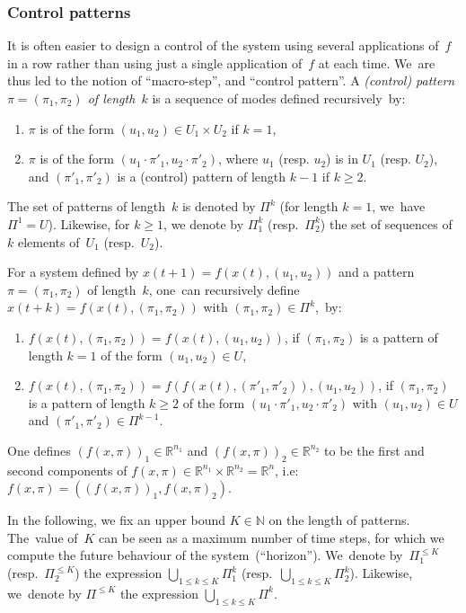 \subsubsection{Control patterns}
It is often easier to design a control of the system using several
applications of~$f$ in a row rather than using just a single
application of~$f$ at each time.  We~are thus led to the notion of
``macro-step'', and ``control pattern''.
%
A \emph{(control) pattern $\pi=(\pi_1,\pi_2)$ of length~$k$} 
is a sequence of modes defined recursively~by:
\begin{enumerate}
\item $\pi$ is of the form $(u_1,u_2)\in U_1\times U_2$ if $k=1$,
\item $\pi$ is of the form $(u_1\cdot \pi'_1,u_2\cdot \pi'_2)$,
where $u_1$ (resp. $u_2$) is in $U_1$ (resp. $U_2$),
and $(\pi'_1,\pi'_2)$ is a (control) pattern of length $k-1$ if $k\geq 2$.
\end{enumerate}

The set of patterns of length~$k$ is denoted by $\Pi^k$ (for length
$k=1$, we~have $\Pi^1=U$). Likewise, for $k\geq 1$, we denote by $\Pi_1^k$
(resp.~$\Pi_2^k$) the set of sequences of $k$ elements of~$U_1$
(resp.~$U_2$).

For a system defined by $x(t+1)=f(x(t),(u_1,u_2))$ and a pattern
$\pi=(\pi_1,\pi_2)$ of length~$k$, one~can  recursively define
$x(t+k)=f(x(t),(\pi_1,\pi_2))$ with ${(\pi_1,\pi_2)\in \Pi^k}$,~by:
\begin{enumerate}
\item $f(x(t),(\pi_1,\pi_2))=f(x(t),(u_1,u_2))$, if $(\pi_1,\pi_2)$ is
  a pattern of length $k=1$ of the form $(u_1,u_2)\in U$,
\item $f(x(t),(\pi_1,\pi_2))=f(f(x(t),(\pi'_1,\pi'_2)),(u_1,u_2))$, if
  $(\pi_1,\pi_2)$ is a pattern of length $k\geq 2$ of the form
  $(u_1\cdot\pi'_1,u_2\cdot\pi'_2)$ with $(u_1,u_2)\in U$ and
  ${(\pi'_1,\pi'_2)\in \Pi^{k-1}}$.
\end{enumerate}
One defines $(f(x,\pi))_1\in \mathbb{R}^{n_1}$ and $(f(x,\pi))_2\in
\mathbb{R}^{n_2}$ to be the first and second components of $f(x,\pi)\in
\mathbb{R}^{n_1}\times\mathbb{R}^{n_2}=\mathbb{R}^{n}$, i.e:
$f(x,\pi)=((f(x,\pi))_1,f(x,\pi)_2)$.


In the following, we fix an upper bound $K\in\mathbb{N}$ 
on the length of patterns.  The~value of~$K$ can be seen as a maximum
number of time steps, for which we compute the future behaviour of the
system~(``horizon'').
%
%
We~denote by~$\Pi_1^{\leq K}$ 
(resp.~$\Pi_2^{\leq K}$)
the expression $\bigcup_{1\leq k \leq K}\Pi_1^k$ 
(resp.~$\bigcup_{1\leq k \leq K} \Pi_2^k$).
Likewise, we~denote by $\Pi^{\leq K}$
the expression $\bigcup_{1\leq k \leq K} \Pi^k$.







